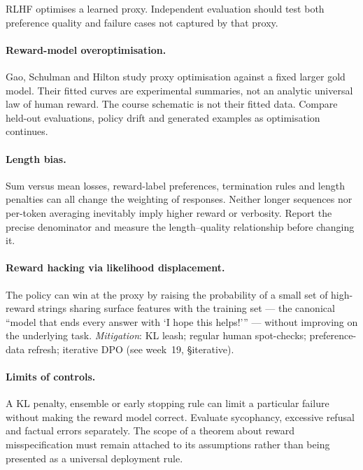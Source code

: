 \documentclass[11pt,oneside]{scrbook}
\begin{document}
\begin{safetyangle}
RLHF optimises a learned proxy. Independent evaluation should test both
preference quality and failure cases not captured by that proxy.

\paragraph{Reward-model overoptimisation.} Gao, Schulman and Hilton study
proxy optimisation against a fixed larger gold model. Their fitted curves
are experimental summaries, not an analytic universal law of human reward.
The course schematic is not their fitted data. Compare held-out evaluations,
policy drift and generated examples as optimisation continues.

\paragraph{Length bias.} Sum versus mean losses, reward-label preferences,
termination rules and length penalties can all change the weighting of
responses. Neither longer sequences nor per-token averaging inevitably imply
higher reward or verbosity. Report the precise denominator and measure the
length--quality relationship before changing it.

\paragraph{Reward hacking via likelihood displacement.} The policy
can win at the proxy by raising the probability of a small set of
high-reward strings sharing surface features with the training set
--- the canonical ``model that ends every answer with `I hope this
helps!''' --- without improving on the underlying task.
\emph{Mitigation}: KL leash; regular human spot-checks; preference-data
refresh; iterative DPO (see week~19, §iterative).

\paragraph{Limits of controls.} A KL penalty, ensemble or early stopping
rule can limit a particular failure without making the reward model correct.
Evaluate sycophancy, excessive refusal and factual errors separately. The
scope of a theorem about reward misspecification must remain attached to its
assumptions rather than being presented as a universal deployment rule.

\end{safetyangle}
\end{document}
